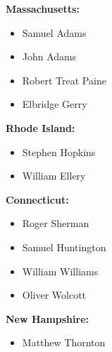\begin{multicols}{3}
\begin{itemize}[wide,itemsep=8pt,label=,labelsep=*,]
{\item \textbf{Massachusetts:}
\begin{itemize}[wide,label=,itemsep=0pt,topsep=0pt]
\item Samuel Adams
\item John Adams
\item Robert Treat Paine
\item Elbridge Gerry
\end{itemize}

\item \textbf{Rhode Island:}
\begin{itemize}[wide,label=,itemsep=0pt,topsep=0pt]
\item Stephen Hopkins
\item William Ellery
\end{itemize}

\item \textbf{Connecticut:}
\begin{itemize}[wide,label=,itemsep=0pt,topsep=0pt]
\item Roger Sherman
\item Samuel Huntington
\item William Williams
\item Oliver Wolcott
\end{itemize}

\item \textbf{New Hampshire:}
\begin{itemize}[wide,label=,itemsep=0pt,topsep=0pt]
\item Matthew Thornton
\end{itemize}

}\end{itemize}
\end{multicols}

